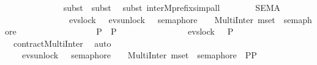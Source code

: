 \begin{isabellebody}
\ \ \ \ \ \ \ \ \ \ \ \ \ \isamarkupfalse%
{\isacharparenleft}{\kern0pt}subst\ {}{\isacharcomma}{\kern0pt}\ subst\ {}{\isacharparenright}{\kern0pt}\ \isamarkupfalse%
{\isacharparenleft}{\kern0pt}subst\ inter{}Mprefix{}{\isacharcomma}{\kern0pt}simp{\isacharunderscore}{\kern0pt}all{\isacharparenright}{\kern0pt}\isanewline
\ \ \ \ \isamarkupfalse%
\ {}\ {\isacharcolon}{\kern0pt}\ {\isacartoucheopen}{\isacharparenleft}{\kern0pt}{\isacharquery}{\kern0pt}SEMA\ {\isacharbar}{\kern0pt}{\isacharbar}{\kern0pt}\ {\isachardot}{\kern0pt}{\isachardot}{\kern0pt}{\isachardot}{\kern0pt}{\isacharparenright}{\kern0pt}\ \isanewline
\ \ \ \ \ \ \ \ \ \ \ \ \ \ {\isacharequal}{\kern0pt}\ evs{\isachardot}{\kern0pt}lock\ {}\ {\isasymrightarrow}\ {\isacharparenleft}{\kern0pt}{\isacharparenleft}{\kern0pt}evs{\isachardot}{\kern0pt}unlock\ {}\ {\isasymrightarrow}\ semaphore\ {}\ \ {\isacharbar}{\kern0pt}{\isacharbar}{\kern0pt}{\isacharbar}{\kern0pt}\ MultiInter\ {\isacharparenleft}{\kern0pt}mset\ {\isacharbrackleft}{\kern0pt}{}{\isachardot}{\kern0pt}{\isachardot}{\kern0pt}{}{\isacharbrackright}{\kern0pt}{\isacharparenright}{\kern0pt}\ semaphore{\isacharparenright}{\kern0pt}\ \isanewline
\ \ \ \ \ \ \ \ \ \ \ \ \ \ \ \ {\isacharbar}{\kern0pt}{\isacharbar}{\kern0pt}\ {\isacharparenleft}{\kern0pt}{\isacharquery}{\kern0pt}P{}\ {\isacharbar}{\kern0pt}{\isacharbar}{\kern0pt}{\isacharbar}{\kern0pt}\ {\isacharquery}{\kern0pt}P{}{\isacharparenright}{\kern0pt}{\isacharparenright}{\kern0pt}{\isacartoucheclose}\isanewline
\ \ \ \ \ \ \ \ \ \ \ \ \ {\isacharparenleft}{\kern0pt}\ {\isacartoucheopen}{\isacharunderscore}{\kern0pt}\ {\isacharequal}{\kern0pt}\ evs{\isachardot}{\kern0pt}lock\ {}\ {\isasymrightarrow}\ {\isacharquery}{\kern0pt}P{}{\isacartoucheclose}{\isacharparenright}{\kern0pt}\isanewline
\ \ \ \ \ \ \ \ \ \ \ \ \ \isamarkupfalse%
\ {}\ contractMultiInter{}{\isacharprime}{\kern0pt}\ \isamarkupfalse%
\ auto\isanewline
\ \ \ \ \isamarkupfalse%
\ {}\ {\isacharcolon}{\kern0pt}\ {\isacartoucheopen}\ {\isacharparenleft}{\kern0pt}evs{\isachardot}{\kern0pt}unlock\ {}\ {\isasymrightarrow}\ semaphore\ {}\ \ {\isacharbar}{\kern0pt}{\isacharbar}{\kern0pt}{\isacharbar}{\kern0pt}\ MultiInter\ {\isacharparenleft}{\kern0pt}mset\ {\isacharbrackleft}{\kern0pt}{}{\isachardot}{\kern0pt}{\isachardot}{\kern0pt}{}{\isacharbrackright}{\kern0pt}{\isacharparenright}{\kern0pt}\ semaphore{\isacharparenright}{\kern0pt}\ {\isacharbar}{\kern0pt}{\isacharbar}{\kern0pt}\ {\isacharparenleft}{\kern0pt}{\isacharquery}{\kern0pt}P{}{\isacharbar}{\kern0pt}{\isacharbar}{\kern0pt}{\isacharbar}{\kern0pt}{\isacharquery}{\kern0pt}P{}{\isacharparenright}{\kern0pt}\ \isanewline

\end{isabellebody}
